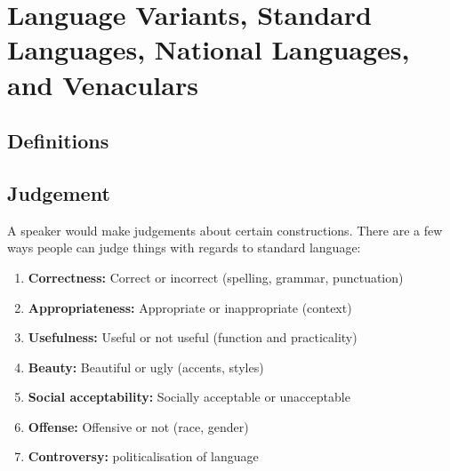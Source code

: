 \documentclass[../main.tex]{subfiles}
\begin{document}
    \section{Language Variants, Standard Languages, National Languages, and Venaculars}

        \subsection{Definitions}

        \subsection{Judgement}
        A speaker would make judgements about certain constructions. There are a few ways people can judge things with regards to standard language:
        \begin{enumerate}
            \item \textbf{Correctness:} Correct or incorrect (spelling, grammar, punctuation)
            \item \textbf{Appropriateness:} Appropriate or inappropriate (context)
            \item \textbf{Usefulness:} Useful or not useful (function and practicality)
            \item \textbf{Beauty:} Beautiful or ugly (accents, styles)
            \item \textbf{Social acceptability:} Socially acceptable or unacceptable
            \item \textbf{Offense:} Offensive or not (race, gender)
            \item \textbf{Controversy:} politicalisation of language
        \end{enumerate}
\end{document}
